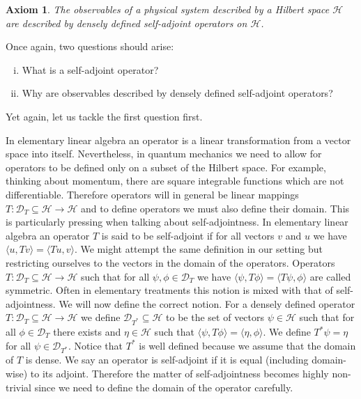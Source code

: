 \documentclass{article}
\newtheorem{axiom}{Axiom}
\begin{document}
\begin{axiom}
The observables of a physical system described by a Hilbert space $\mathcal{H}$ are described by densely defined self-adjoint operators on $\mathcal{H}$.
\end{axiom}

Once again, two questions should arise:
\begin{enumerate}[(i)]
\item What is a self-adjoint operator?
\item Why are observables described by densely defined self-adjoint operators?
\end{enumerate}
Yet again, let us tackle the first question first.

In elementary linear algebra an operator is a linear transformation from a vector space into itself. Nevertheless, in quantum mechanics we need to allow for operators to be defined only on a subset of the Hilbert space. For example, thinking about momentum, there are square integrable functions which are not differentiable. Therefore operators will in general be linear mappings $T:\mathcal{D}_T\subseteq\mathcal{H}\rightarrow\mathcal{H}$ and to define operators we must also define their domain. This is particularly pressing when talking about self-adjointness. In elementary linear algebra an operator $T$ is said to be self-adjoint if for all vectors $v$ and $u$ we have $\langle u,Tv\rangle=\langle Tu,v\rangle$. We might attempt the same definition in our setting but restricting ourselves to the vectors in the domain of the operators. Operators $T:\mathcal{D}_T\subseteq\mathcal{H}\rightarrow\mathcal{H}$ such that for all $\psi,\phi\in\mathcal{D}_T$ we have $\langle \psi,T\phi\rangle=\langle T\psi,\phi\rangle$ are called symmetric. Often in elementary treatments this notion is mixed with that of self-adjointness. We will now define the correct notion. For a densely defined operator $T:\mathcal{D}_T\subseteq\mathcal{H}\rightarrow\mathcal{H}$ we define $\mathcal{D}_{T^*}\subseteq\mathcal{H}$ to be the set of vectors $\psi\in\mathcal{H}$ such that for all $\phi\in\mathcal{D}_T$ there exists and $\eta\in\mathcal{H}$ such that $\langle\psi,T\phi\rangle=\langle \eta, \phi\rangle$. We define $T^*\psi=\eta$ for all $\psi\in\mathcal{D}_{T^*}$. Notice that $T^*$ is well defined because we assume that the domain of $T$ is dense. We say an operator is self-adjoint if it is equal (including domain-wise) to its adjoint. Therefore the matter of self-adjointness becomes highly non-trivial since we need to define the domain of the operator carefully.
\end{document}
